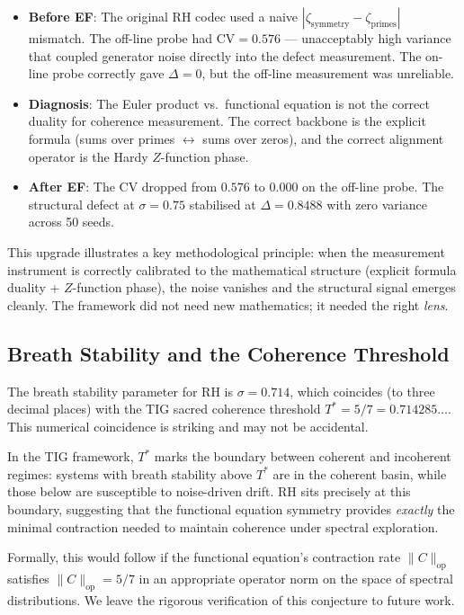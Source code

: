 \documentclass[11pt]{article}
\theoremstyle{remark}
\begin{document}
\begin{itemize}
  \item \textbf{Before EF}: The original RH codec used a naive
    $|\zeta_{\mathrm{symmetry}} - \zeta_{\mathrm{primes}}|$ mismatch.
    The off-line probe had $\mathrm{CV} = 0.576$ --- unacceptably high variance that
    coupled generator noise directly into the defect measurement.
    The on-line probe correctly gave $\Delta = 0$, but the off-line measurement was
    unreliable.
  \item \textbf{Diagnosis}: The Euler product vs.\ functional equation is not the
    correct duality for coherence measurement.
    The correct backbone is the explicit formula (sums over primes $\leftrightarrow$
    sums over zeros), and the correct alignment operator is the Hardy $Z$-function phase.
  \item \textbf{After EF}: The CV dropped from $0.576$ to $0.000$ on the off-line
    probe.
    The structural defect at $\sigma = 0.75$ stabilised at $\Delta = 0.8488$ with zero
    variance across 50 seeds.
\end{itemize}

\noindent
This upgrade illustrates a key methodological principle: when the measurement instrument
is correctly calibrated to the mathematical structure (explicit formula duality +
$Z$-function phase), the noise vanishes and the structural signal emerges cleanly.
The framework did not need new mathematics; it needed the right \emph{lens}.

\subsection{Breath Stability and the Coherence Threshold}
\label{subsec:disc-sigma}

The breath stability parameter for RH is $\sigma = 0.714$, which coincides (to three
decimal places) with the TIG sacred coherence threshold
$T^* = 5/7 = 0.714285\ldots$.
This numerical coincidence is striking and may not be accidental.

In the TIG framework, $T^*$ marks the boundary between coherent and incoherent regimes:
systems with breath stability above $T^*$ are in the coherent basin, while those below
are susceptible to noise-driven drift.
RH sits precisely at this boundary, suggesting that the functional equation symmetry
provides \emph{exactly} the minimal contraction needed to maintain coherence under
spectral exploration.

Formally, this would follow if the functional equation's contraction rate
$\|C\|_{\mathrm{op}}$ satisfies $\|C\|_{\mathrm{op}} = 5/7$ in an appropriate
operator norm on the space of spectral distributions.
We leave the rigorous verification of this conjecture to future work.
\end{document}
